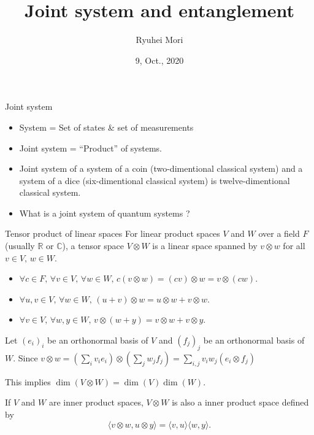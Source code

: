\documentclass[10pt]{beamer}
\title{Joint system and entanglement}
\author{Ryuhei Mori}
\institute{Tokyo Institute of Technology}
\date{9, Oct., 2020}
\newcommand\emm[1]{\textcolor{redorange}{{#1}}}
\begin{document}
\begin{frame}[plain]
\maketitle
\end{frame}


\begin{frame}{Joint system}
\begin{itemize}
\setlength{\itemsep}{2em}
\item System = Set of states \& set of measurements
\item \emm{Joint} system = ``Product'' of systems.
\item \emm{Joint} system of a system of a coin (two-dimentional classical system) and a system of a dice (six-dimentional classical system) is twelve-dimentional classical system.
\item What is a \emm{joint} system of quantum systems ?
\end{itemize}
\end{frame}

\begin{frame}{Tensor product of linear spaces}
For linear product spaces $V$ and $W$ over a field $F$ (usually $\mathbb{R}$ or $\mathbb{C}$),
a tensor space $V\otimes W$ is a linear space spanned by $v\otimes w$ for all $v\in V,\, w\in W$.

\vspace{1em}
\begin{itemize}
\setlength{\itemsep}{2em}
\item $\forall c\in F,\,\forall v\in V,\, \forall w\in W,\, c(v\otimes w) = (cv)\otimes w = v\otimes (cw) $.
\item $\forall u,v\in V,\, \forall w\in W,\, (u+v)\otimes w = u\otimes w + v\otimes w $.
\item $\forall v\in V,\, \forall w,y\in W,\, v\otimes (w+y) = v\otimes w + v\otimes y $.
\end{itemize}

\vspace{1em}
Let $(e_i)_i$ be an orthonormal basis of $V$ and $(f_j)_j$ be an orthonormal basis of $W$.
Since $v\otimes w = (\sum_i v_i e_i)\otimes(\sum_j w_j f_j) = \sum_{i,j} v_i w_j (e_i\otimes f_j)$

This implies \emm{$\dim(V\otimes W) =\dim(V)\dim(W)$}.

\vspace{1em}
If $V$ and $W$ are inner product spaces, $V\otimes W$ is also a inner product space defined by
\begin{equation*}
\langle v\otimes w, u\otimes y\rangle =
\langle v, u\rangle\langle w, y\rangle.
\end{equation*}
\end{frame}
\end{document}
